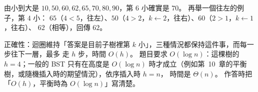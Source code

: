 由小到大是 $10, 50, 60, 62, 65, 70, 80, 90$，第 $6$ 小確實是 $70$。 再舉一個往左的例子，第 $4$ 小：
$65$（$4 < 5$，往左）、$50$（$4 > 2$，$k \gets 2$，往右）、$60$（$2 > 1$，$k \gets 1$，往右）、
$62$（相等），回傳 $62$。

正確性：迴圈維持「答案是目前子樹裡第 $k$ 小」，三種情況都保持這件事，而每一步往下一層，最多
走 $h$ 步，時間 $O(h)$。 題目要求 $O(\log n)$：這棵樹的 $h = 4$；一般的 BST 只有在高度是
$O(\log n)$ 時才成立（例如第~10~章的平衡樹，或隨機插入時的期望情況），依序插入時 $h = n$，
時間是 $\Theta(n)$。 作答時把「$O(h)$，平衡時為 $O(\log n)$」寫清楚。
